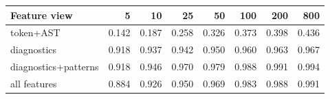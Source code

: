 \begin{tabular}{lrrrrrrr}
\toprule
\textbf{Feature view} & \textbf{5} & \textbf{10} & \textbf{25} & \textbf{50} & \textbf{100} & \textbf{200} & \textbf{800}\\
\midrule
token+AST & 0.142 & 0.187 & 0.258 & 0.326 & 0.373 & 0.398 & 0.436\\
diagnostics & 0.918 & 0.937 & 0.942 & 0.950 & 0.960 & 0.963 & 0.967\\
diagnostics+patterns & 0.918 & 0.946 & 0.970 & 0.979 & 0.988 & 0.991 & 0.994\\
all features & 0.884 & 0.926 & 0.950 & 0.969 & 0.983 & 0.988 & 0.991\\\bottomrule
\end{tabular}
